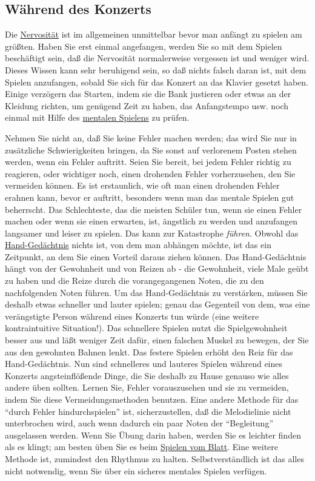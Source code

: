 
\subsection{Während des Konzerts}\hypertarget{c1iii14g}{}

Die \hyperlink{c1iii15}{Nervosität} ist im allgemeinen unmittelbar bevor man anfängt zu spielen am größten.
Haben Sie erst einmal angefangen, werden Sie so mit dem Spielen beschäftigt sein, daß die Nervosität normalerweise vergessen ist und weniger wird.
Dieses Wissen kann sehr beruhigend sein, so daß nichts falsch daran ist, mit dem Spielen anzufangen, sobald Sie sich für das Konzert an das Klavier gesetzt haben.
Einige verzögern das Starten, indem sie die Bank justieren oder etwas an der Kleidung richten, um genügend Zeit zu haben, das Anfangstempo usw. noch einmal mit Hilfe des \hyperlink{c1ii12mental}{mentalen Spielens} zu prüfen.

Nehmen Sie nicht an, daß Sie keine Fehler machen werden; das wird Sie nur in zusätzliche Schwierigkeiten bringen, da Sie sonst auf verlorenem Posten stehen werden, wenn ein Fehler auftritt.
Seien Sie bereit, bei jedem Fehler richtig zu reagieren, oder wichtiger noch, einen drohenden Fehler vorherzusehen, den Sie vermeiden können.
Es ist erstaunlich, wie oft man einen drohenden Fehler erahnen kann, bevor er auftritt, besonders wenn man das mentale Spielen gut beherrscht.
Das Schlechteste, das die meisten Schüler tun, wenn sie einen Fehler machen oder wenn sie einen erwarten, ist, ängstlich zu werden und anzufangen langsamer und leiser zu spielen.
Das kann zur Katastrophe \textit{führen}.
Obwohl das \hyperlink{c1iii6d}{Hand-Gedächtnis} nichts ist, von dem man abhängen möchte, ist das ein Zeitpunkt, an dem Sie einen Vorteil daraus ziehen können.
Das Hand-Gedächtnis hängt von der Gewohnheit und von Reizen ab - die Gewohnheit, viele Male geübt zu haben und die Reize durch die vorangegangenen Noten, die zu den nachfolgenden Noten führen.
Um das Hand-Gedächtnis zu verstärken, müssen Sie deshalb etwas schneller und lauter spielen; genau das Gegenteil von dem, was eine verängstigte Person während eines Konzerts tun würde (eine weitere kontraintuitive Situation!).
Das schnellere Spielen nutzt die Spielgewohnheit besser aus und läßt weniger Zeit dafür, einen falschen Muskel zu bewegen, der Sie aus den gewohnten Bahnen lenkt.
Das festere Spielen erhöht den Reiz für das Hand-Gedächtnis.
Nun sind schnelleres und lauteres Spielen während eines Konzerts angsteinflößende Dinge, die Sie deshalb zu Hause genauso wie alles andere üben sollten.
Lernen Sie, Fehler vorauszusehen und sie zu vermeiden, indem Sie diese Vermeidungsmethoden benutzen.
Eine andere Methode für das \enquote{durch Fehler hindurchspielen} ist, sicherzustellen, daß die Melodielinie nicht unterbrochen wird, auch wenn dadurch ein paar Noten der \enquote{Begleitung} ausgelassen werden.
Wenn Sie Übung darin haben, werden Sie es leichter finden als es klingt; am besten üben Sie es beim \hyperlink{c1iii11}{Spielen vom Blatt}.
Eine weitere Methode ist, zumindest den Rhythmus zu halten.
Selbstverständlich ist das alles nicht notwendig, wenn Sie über ein sicheres mentales Spielen verfügen.

